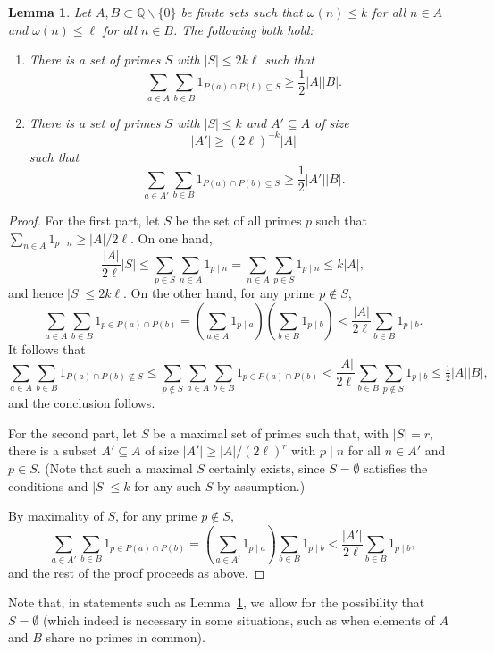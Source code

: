 \documentclass{amsart}
\renewcommand{\leq}{\leqslant}
\renewcommand{\geq}{\geqslant}
\newcommand{\bbq}{\mathbb{Q}}
\newcommand{\abs}[1]{\left\lvert #1\right\rvert}
\newcommand{\brac}[1]{\left( #1\right)}
\newtheorem{lemma}{Lemma}
\theoremstyle{definition}
\begin{document}
\begin{lemma}\label{lem-warmup1}
Let $A,B\subset \bbq\backslash\{0\}$ be finite sets such that $\omega(n)\leq k$ for all $n\in A$ and $\omega(n)\leq \ell$ for all $n\in B$. The following both hold:
\begin{enumerate}
\item There is a set of primes $S$ with $\abs{S}\leq 2k\ell$ such that
\[\sum_{a\in A}\sum_{b\in B}1_{P(a)\cap P(b)\subseteq S}\geq \frac{1}{2}\abs{A}\abs{B}.\]
\item There is a set of primes $S$ with $\abs{S}\leq k$ and $A'\subseteq A$ of size 
\[\abs{A'}\geq (2\ell)^{-k}\abs{A}\]
such that
\[\sum_{a\in A'}\sum_{b\in B}1_{P(a)\cap P(b)\subseteq S}\geq \frac{1}{2}\abs{A'}\abs{B}.\]
\end{enumerate}
\end{lemma}
\begin{proof}
For the first part, let $S$ be the set of all primes $p$ such that $\sum_{n\in A}1_{p\mid n}\geq \abs{A}/2\ell$. On one hand,
\[\frac{\abs{A}}{2\ell}\abs{S}\leq \sum_{p\in S}\sum_{n\in A}1_{p\mid n}= \sum_{n\in A}\sum_{p\in S} 1_{p\mid n}\leq k\abs{A},\]
and hence $\abs{S}\leq 2k\ell$. On the other hand, for any prime $p\not\in S$,
\[\sum_{a\in A}\sum_{b\in B}1_{p\in P(a)\cap P(b)}=\brac{\sum_{a\in A}1_{p\mid a}}\brac{\sum_{b\in B}1_{p\mid b}}<\frac{\abs{A}}{2\ell}\sum_{b\in B}1_{p\mid b}.\]
It follows that
\[\sum_{a\in A}\sum_{b\in B}1_{P(a)\cap P(b)\not\subseteq S}\leq \sum_{p\not\in S}\sum_{a\in A}\sum_{b\in B}1_{p\in P(a)\cap P(b)}
<\frac{\abs{A}}{2\ell}\sum_{b\in B}\sum_{p\not\in S}1_{p\mid b}\leq \tfrac{1}{2}\abs{A}\abs{B},\]
and the conclusion follows.

For the second part, let $S$ be a maximal set of primes such that, with $\abs{S}=r$, there is a subset $A'\subseteq A$ of size $\abs{A'}\geq \abs{A}/(2\ell)^r$ with $p\mid n$ for all $n\in A'$ and $p\in S$. (Note that such a maximal $S$ certainly exists, since $S=\emptyset$ satisfies the conditions and $\abs{S}\leq k$ for any such $S$ by assumption.)

By maximality of $S$, for any prime $p\not\in S$,
\[\sum_{a\in A'}\sum_{b\in B}1_{p\in P(a)\cap P(b)}=\brac{\sum_{a\in A'}1_{p\mid a}}\sum_{b\in B}1_{p\mid b}< \frac{\abs{A'}}{2\ell}\sum_{b\in B}1_{p\mid b},\]
and the rest of the proof proceeds as above.
\end{proof}

Note that, in statements such as Lemma~\ref{lem-warmup1}, we allow for the possibility that $S=\emptyset$ (which indeed is necessary in some situations, such as when elements of $A$ and $B$ share no primes in common). 
\end{document}
